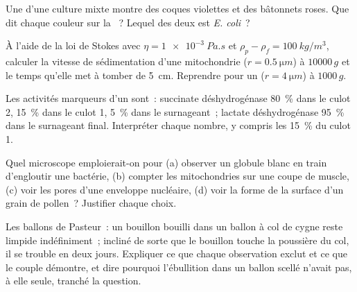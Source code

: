 \begin{exercise}[$\star\star$]\label{exo:b1:cell-unit-of-life:6}
Une  d'une culture mixte montre des coques violettes
et des bâtonnets roses. Que dit chaque couleur sur la ~? Lequel
des deux est \emph{E. coli}~?
\end{exercise}

\begin{exercise}[$\star\star$]\label{exo:b1:cell-unit-of-life:7}
À l'aide de la loi de Stokes avec $\eta = \qty{1e-3}{Pa.s}$ et
$\rho_p - \rho_f =
\qty{100}{kg/m^3}$, calculer la vitesse de sédimentation d'une
mitochondrie ($r = \qty{0.5}{\micro m}$) à $\num{10000}\,g$ et le temps
qu'elle met à tomber de \qty{5}{cm}. Reprendre pour un 
($r = \qty{4}{\micro m}$) à $1000\,g$.
\end{exercise}

\begin{exercise}[$\star\star$]\label{exo:b1:cell-unit-of-life:8}
Les activités marqueurs d'un  sont~: succinate déshydrogénase
\qty{80}{\%} dans le culot 2, \qty{15}{\%} dans le culot 1, \qty{5}{\%}
dans le surnageant~; lactate déshydrogénase \qty{95}{\%} dans le
surnageant final. Interpréter chaque nombre, y compris les \qty{15}{\%}
du culot 1.
\end{exercise}

\begin{exercise}[$\star\star$]\label{exo:b1:cell-unit-of-life:9}
Quel microscope emploierait-on pour (a) observer un globule blanc en
train d'engloutir une bactérie, (b) compter les mitochondries sur une
coupe de muscle, (c) voir les pores d'une enveloppe nucléaire, (d) voir
la forme de la surface d'un grain de pollen~? Justifier chaque choix.
\end{exercise}

\begin{exercise}[$\star\star\star$]\label{exo:b1:cell-unit-of-life:10}
Les ballons de Pasteur~: un bouillon bouilli dans un ballon à col de
cygne reste limpide indéfiniment~; incliné de sorte que le bouillon
touche la poussière du col, il se trouble en deux jours. Expliquer ce
que chaque observation exclut et ce que le couple démontre, et dire
pourquoi l'ébullition dans un ballon scellé n'avait pas, à elle seule,
tranché la question.
\end{exercise}

